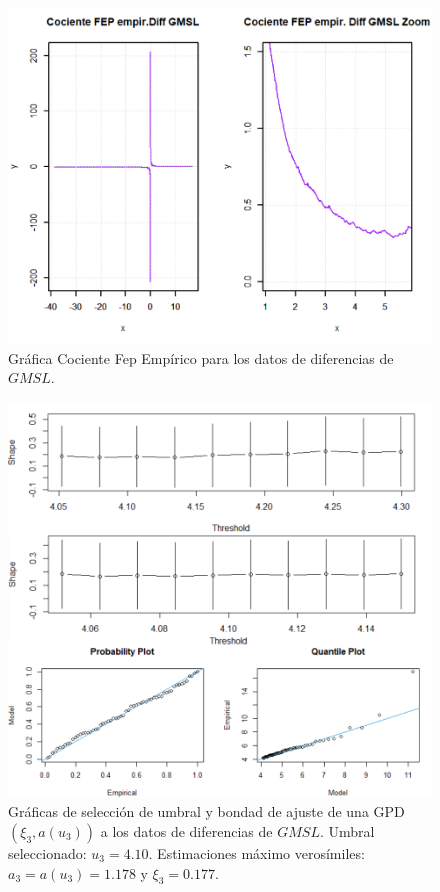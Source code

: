 \documentclass[10.5pt,notitlepage]{article}
\theoremstyle{plain}
\begin{document}
\begin{figure}[htb]
    \centering
    \includegraphics[scale = 0.4]{incisoc/DCocFepGMSL.png}
    \caption{Gráfica Cociente Fep Empírico para los datos de diferencias de \(GMSL\).}
    \label{fig:18}
\end{figure}

\begin{figure}[htb]
    \centering
    \includegraphics[scale = 0.4]{incisoc/DAp1GMSL.png}
    \caption{Gráficas de selección de umbral y bondad de ajuste de una GPD\((\xi_3,a(u_3))\) a los datos de diferencias de \(GMSL\). Umbral seleccionado: \(u_3 = 4.10\). Estimaciones máximo verosímiles:  \(a_3 =a(u_3) = 1.178\) y \(\xi_3 = 0.177\).}
    \label{fig:19}
\end{figure}
\end{document}
